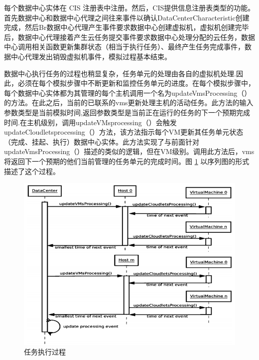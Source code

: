每个数据中心实体在 CIS 注册表中注册。然后，CIS提供信息注册表类型的功能。首先数据中心和数据中心代理之间往来事件以确认DataCenterCharacteristic创建完成，然后Br数据中心代理产生事件要求数据中心创建虚拟机，虚拟机创建完毕后，数据中心代理接着产生云任务提交事件要求数据中心处理分配的云任务，数据中心调用相关函数更新集群状态（相当于执行任务）、最终产生任务完成事件，数据中心代理发出销毁虚拟机事件，模拟过程基本结束。

数据中心执行任务的过程也稍显复杂，任务单元的处理由各自的虚拟机处理.因此，必须在每个模拟步骤中不断更新和监控任务单元的进度。在每个模拟步骤中，每个数据中心实体都为其管理的每个主机调用一个名为updateVmsProcessing（）的方法。在此之后，当前的已联系的vms更新处理主机的活动任务。此方法的输入参数类型是当前模拟时间,返回参数类型是当前正在运行的任务的下一个预期完成时间.在主机级别，调用updateVMsprocessing（）会触发updateCloudletsprocessing（）方法，该方法指示每个VM更新其任务单元状态（完成、挂起、执行）数据中心实体。此方法实现了与前面针对updateVmsProcessing（）描述的类似的逻辑，但在VM级别。调用此方法后，vms将返回下一个预期的他们当前管理的任务单元的完成时间。图 \ref{Fig:chap4_3} 以序列图的形式描述了这个过程。

\begin{figure}[htbp]
  \centering
  \includegraphics{./Figure/IMG_Chap4_3.png}
  \caption{任务执行过程}\label{Fig:chap4_3}
\end{figure}

